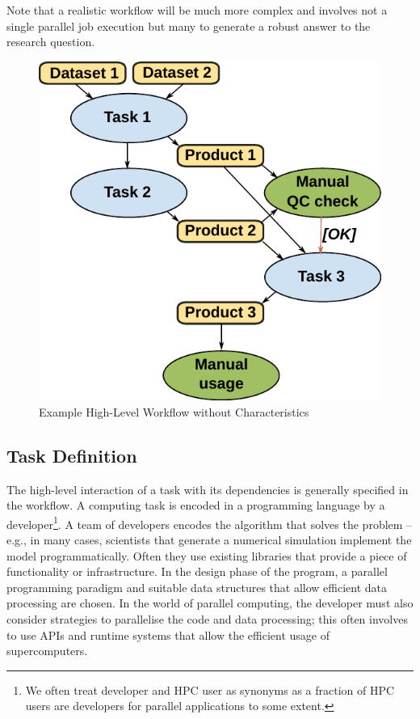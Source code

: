 \documentclass[a4paper, twocolumn]{article}
\begin{document}
Note that a realistic workflow will be much more complex and involves not a single parallel job execution but many to generate a robust answer to the research question.


\begin{figure}[b]
  \centering
  \includegraphics[width=0.75\columnwidth]{workflow}
  \caption{Example High-Level Workflow without Characteristics}
  \label{fig:workflow}
\end{figure}

\subsection{Task Definition}

The high-level interaction of a task with its dependencies is generally specified in the workflow.
A computing task is encoded in a programming language by a developer\footnote{We often treat developer and HPC user as synonyms as a fraction of HPC users are developers for parallel applications to some extent.}.
A team of developers encodes the algorithm that solves the problem -- e.g., in many cases,  scientists that generate a numerical simulation implement the model programmatically.
Often they use existing libraries that provide a piece of functionality or infrastructure.
In the design phase of the program, a parallel programming paradigm and suitable data structures that allow efficient data processing are chosen.
In the world of parallel computing, the developer must also consider strategies to parallelise the code and data processing; this often involves to use APIs and runtime systems that allow the efficient usage of supercomputers.
\end{document}
